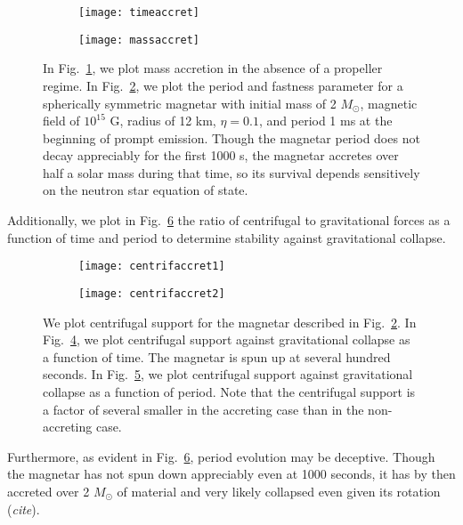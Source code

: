 \documentclass{article}
\begin{document}
\begin{figure}[h!]
\centering
\begin{subfigure}{.5\textwidth}
    \centering
    \texttt{[image: timeaccret]}
    \caption{}
    \label{fig:5a}
\end{subfigure}%
\begin{subfigure}{.5\textwidth}
    \centering
    \texttt{[image: massaccret]}
    \caption{}
    \label{fig:5b}
\end{subfigure}
\caption{In Fig.~\ref{fig:5a}, we plot mass accretion in the absence of a propeller regime. In Fig.~\ref{fig:5b}, we plot the period and fastness parameter for a spherically symmetric  magnetar with initial mass of 2 $M_{\odot}$, magnetic field of $10^{15}$ G, radius of 12 km, $\eta=0.1$,  and period 1 ms at the beginning of prompt emission. Though the magnetar period does not decay appreciably for the first 1000 s, the magnetar accretes over half a solar mass during that time, so its survival depends sensitively on the neutron star equation of state.}
\label{}
\end{figure}

Additionally, we plot in Fig.~\ref{fig:6} the ratio of centrifugal to gravitational forces as a function of time and period to determine stability against gravitational collapse.

\begin{figure}[h!]
\centering
\begin{subfigure}{.5\textwidth}
    \centering
    \texttt{[image: centrifaccret1]}
    \caption{}
    \label{fig:6a}
\end{subfigure}%
\begin{subfigure}{.5\textwidth}
    \centering
    \texttt{[image: centrifaccret2]}
    \caption{}
    \label{fig:6b}
\end{subfigure}
\caption{We plot centrifugal support for the magnetar described in Fig.~\ref{fig:5b}. In Fig.~\ref{fig:6a}, we plot centrifugal support against gravitational collapse as a function of time. The magnetar is spun up at several hundred seconds. In Fig.~\ref{fig:6b}, we plot centrifugal support against gravitational collapse as a function of period. Note that the centrifugal support is a factor of several smaller in the accreting case than in the non-accreting case.}
\label{fig:6}
\end{figure}

Furthermore, as evident in Fig.~\ref{fig:6}, period evolution may be deceptive. Though the magnetar has not spun down appreciably even at 1000 seconds, it has by then accreted over 2 $M_{\odot}$ of material and very likely collapsed even given its rotation (\textit{cite}).
\end{document}
